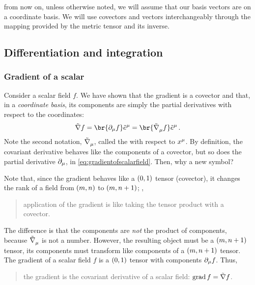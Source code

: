 from now on, unless otherwise noted, we will assume that our basis vectors are on a coordinate basis. We will use covectors and vectors interchangeably through the mapping provided by the metric tensor and its inverse.


%
%
\setcounter{equation}{53}
%


\subsection{Differentiation and integration}


\subsubsection{Gradient of a scalar}
%
 Consider a scalar field $f$. We have shown that the gradient is a covector and that, in a \emph{coordinate basis}, its components are simply the partial derivatives with respect to the coordinates:
%
\begin{equation}\label{eq:gradientofscalarfield}
  \gradcov f = \br{\ipd\mu f}\tbcov\mu 
             = \br{\tgradcov\mu f}\tbcov\mu\,.
\end{equation}
%
 Note the second notation, $\tgradcov\mu$, called the  with respect to $\tvec\pos\mu$. By definition, the covariant derivative behaves like the components of a covector, but so does the partial derivative $\partial_{\mu}$, in \cref{eq:gradientofscalarfield}. Then, why a new symbol?

 Note that, since the gradient behaves like a $\torder 01$ tensor (covector), it changes the rank of a field from $\torder mn$ to $\torder{m}{n+1}$; \ie,
%
\begin{quotation}
  application of the gradient is like taking the tensor product with a covector.
\end{quotation}
%
The difference is that the components are \emph{not} the product of components, because $\tgradcov\mu$ is not a number. However, the resulting object must be a $\torder{m}{n+1}$ tensor, its components must transform like components of a $\torder{m}{n+1}$ tensor. The gradient of a scalar field $f$ is a $\torder 01$ tensor with components $\partial_{\mu} f$. Thus,
%
\begin{quotation}
  the gradient is the covariant derivative of a scalar field: $\operatorname{grad} f = \tilde{\nabla} f$.
\end{quotation}


